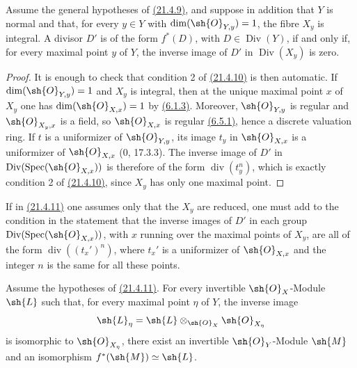 \begin{corollary}[21.4.11]
\ifdefined\EGAIVSuppressErratumLabels\else\label{IV.21.4.11}\fi
Assume the general hypotheses of {\hyperlink{ega4.c04.prop.21-4-9}{(21.4.9)}}, and suppose in addition that
$Y$ is normal and that, for every $y\in Y$ with
$\dim(\sh{O}_{Y,y})=1$, the fibre $X_y$ is integral.  A divisor $D'$ is
of the form $f^*(D)$, with $D\in\operatorname{Div}(Y)$, if and only if,
for every maximal point $y$ of $Y$, the inverse image of $D'$ in
$\operatorname{Div}(X_y)$ is zero.
\end{corollary}

\begin{proof}
It is enough to check that condition 2\textdegree{} of {\hyperlink{ega4.c04.cor.21-4-10}{(21.4.10)}} is then
automatic.  If $\dim(\sh{O}_{Y,y})=1$ and $X_y$ is integral, then at
the unique maximal point $x$ of $X_y$ one has
$\dim(\sh{O}_{X,x})=1$ by {\hyperlink{ega4.c04.cor.6-1-3}{(6.1.3)}}.  Moreover,
$\sh{O}_{Y,y}$ is regular and $\sh{O}_{X_y,x}$ is a field, so
$\sh{O}_{X,x}$ is regular {\hyperlink{ega4.c04.prop.6-5-1}{(6.5.1)}}, hence a discrete valuation ring.
If $t$ is a uniformizer of $\sh{O}_{Y,y}$, its image $t_y$ in
$\sh{O}_{X,x}$ is a uniformizer of $\sh{O}_{X,x}$
($0$, 17.3.3).  The inverse image of $D'$ in
$\operatorname{Div}(\operatorname{Spec}(\sh{O}_{X,x}))$ is therefore
of the form $\operatorname{div}(t_y^n)$, which is exactly condition
2\textdegree{} of {\hyperlink{ega4.c04.cor.21-4-10}{(21.4.10)}}, since $X_y$ has only one maximal point.
\end{proof}

\begin{remark}[21.4.12]
\ifdefined\EGAIVSuppressErratumLabels\else\label{IV.21.4.12}\fi
If in {\hyperlink{ega4.c04.cor.21-4-11}{(21.4.11)}} one assumes only that the $X_y$ are reduced, one must
add to the condition in the statement that the inverse images of $D'$
in each group
$\operatorname{Div}(\operatorname{Spec}(\sh{O}_{X,x}))$, with $x$
running over the maximal points of $X_y$, are all of the form
$\operatorname{div}((t_x')^n)$, where $t_x'$ is a uniformizer of
$\sh{O}_{X,x}$ and the integer $n$ is the same for all these points.
\end{remark}

\begin{corollary}[21.4.13]
\ifdefined\EGAIVSuppressErratumLabels\else\label{IV.21.4.13}\fi
Assume the hypotheses of {\hyperlink{ega4.c04.cor.21-4-11}{(21.4.11)}}.  For every invertible
$\sh{O}_X$-Module $\sh{L}$ such that, for every maximal point $\eta$ of
$Y$, the inverse image
\[
 \sh{L}_\eta
 =\sh{L}\otimes_{\sh{O}_X}\sh{O}_{X_\eta}
\]
is isomorphic to $\sh{O}_{X_\eta}$, there exist an invertible
$\sh{O}_Y$-Module $\sh{M}$ and an isomorphism
$f^*(\sh{M})\simeq\sh{L}$.
\end{corollary}

